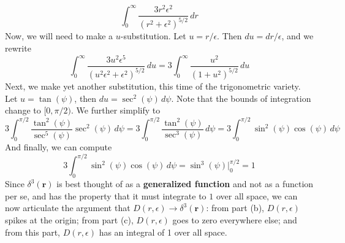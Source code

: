 \documentclass[a4paper]{article}
\begin{document}
\begin{enumerate}[label=(\alph*)]
	\[
		\int^{\infty}_{0} \frac{3r^{2}\epsilon^{2}}{\!\left( r^{2} + \epsilon^{2} \right)^{5/2}} \, dr  
	\]
	Now, we will need to make a \( u \)-substitution. Let \( u = r / \epsilon \). Then \( du = dr / \epsilon \), and we rewrite
	\[
		\int^{\infty}_{0} \frac{3u^{2}\epsilon^{5}}{\!\left( u^{2}\epsilon^{2} + \epsilon^{2} \right)^{5/2}} \, du = 3 \int^{\infty}_{0} \frac{u^{2}}{\!\left( 1 + u^{2} \right)^{5/2}} \, du 
	\]
	Next, we make yet another substitution, this time of the trigonometric variety. Let \( u = \tan\!\left(\psi\right) \), then \( du = \sec^{2}\!\left(\psi\right) \, d \psi \). Note that the bounds of integration change to \( [0,\pi / 2) \). We further simplify to
	\[
		3\int^{\pi / 2}_{0} \frac{\tan^{2}\!\left(\psi\right)}{\sec^{5}\!\left(\psi\right)}\sec^{2}\!\left(\psi\right) \, d \psi = 3\int^{\pi / 2}_{0} \frac{\tan^{2}\!\left(\psi\right)}{\sec^{3}\!\left(\psi\right)} \, d \psi = 3\int^{\pi / 2}_{0} \sin^{2}\!\left(\psi\right)\cos\!\left(\psi\right) \, d \psi   
	\]
	And finally, we can compute
	\[
		3\int^{\pi / 2}_{0} \sin^{2}\!\left(\psi\right)\cos\!\left(\psi\right) \, d \psi = \sin^{3}\!\left(\psi\right) \Big|^{\pi / 2}_{0} = 1
	\]
	Since \( \delta^{3}\!\left( \pmb{r} \right) \) is best thought of as a \textbf{generalized function} and not as a function per se, and has the property that it must integrate to \( 1 \) over all space, we can now articulate the argument that \( D \!\left( r,\epsilon \right) \rightarrow \delta^{3}\!\left( \pmb{r} \right) \): from part (b), \( D \!\left( r,\epsilon \right) \) spikes at the origin; from part (c), \( D \!\left( r,\epsilon \right) \) goes to zero everywhere else; and from this part, \( D \!\left( r,\epsilon \right) \) has an integral of 1 over all space.
\end{enumerate}
\end{document}
